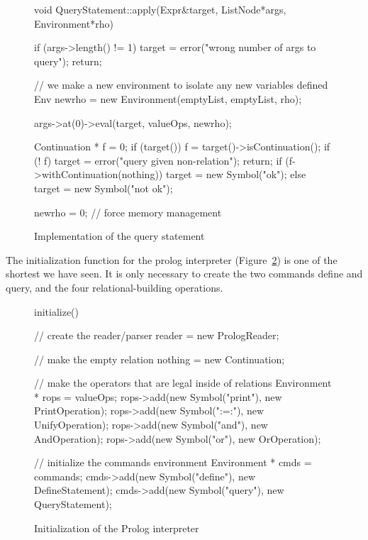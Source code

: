\begin{figure}
\begin{cprog}
void QueryStatement::apply(Expr&target, ListNode*args, Environment*rho)
{
	if (args->length() != 1) {
		target = error("wrong number of args to query");
		return;
		}

	// we make a new environment to isolate any new variables defined
	Env newrho = new Environment(emptyList, emptyList, rho);

	args->at(0)->eval(target, valueOps, newrho);

	Continuation * f = 0;
	if (target())
		f = target()->isContinuation();
	if (! f) {
		target = error("query given non-relation");
		return;
		}
	if (f->withContinuation(nothing))
		target = new Symbol("ok");
	else
		target = new Symbol("not ok");

	newrho = 0;	// force memory management
}
\end{cprog}
\caption{Implementation of the query statement}\label{query}
\end{figure}

The initialization function for the prolog interpreter 
(Figure~\ref{prologinit}) is one of the shortest we have seen.
It is only necessary to create the two commands {\sf define} and {\sf query}, 
and the four relational-building operations.

\begin{figure}
\begin{cprog}
initialize()
{
	// create the reader/parser 
	reader = new PrologReader;

	// make the empty relation
	nothing = new Continuation;

	// make the operators that are legal inside of relations
	Environment * rops = valueOps;
	rops->add(new Symbol("print"), new PrintOperation);
	rops->add(new Symbol(":=:"), new UnifyOperation);
	rops->add(new Symbol("and"), new AndOperation);
	rops->add(new Symbol("or"), new OrOperation);

	// initialize the commands environment
	Environment * cmds = commands;
	cmds->add(new Symbol("define"), new DefineStatement);
	cmds->add(new Symbol("query"), new QueryStatement);
}
\end{cprog}
\caption{Initialization of the Prolog interpreter}\label{prologinit}
\end{figure}
